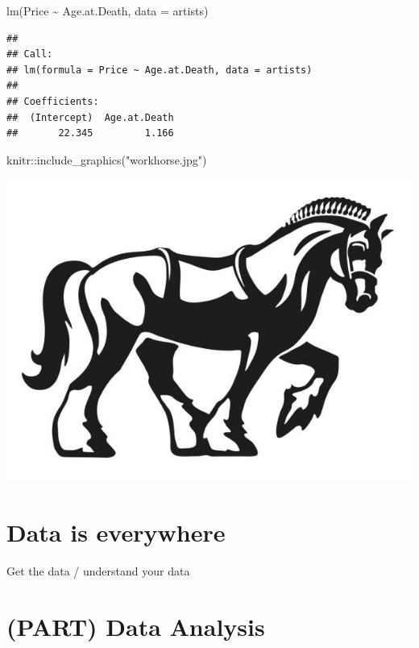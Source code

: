 \documentclass[
]{book}
\newenvironment{Shaded}{\begin{snugshade}}{\end{snugshade}}
\newcommand{\AttributeTok}[1]{\textcolor[rgb]{0.77,0.63,0.00}{#1}}
\newcommand{\FunctionTok}[1]{\textcolor[rgb]{0.00,0.00,0.00}{#1}}
\newcommand{\NormalTok}[1]{#1}
\newcommand{\SpecialCharTok}[1]{\textcolor[rgb]{0.00,0.00,0.00}{#1}}
\newcommand{\StringTok}[1]{\textcolor[rgb]{0.31,0.60,0.02}{#1}}
\begin{document}
\begin{Shaded}
\begin{Highlighting}[]
\FunctionTok{lm}\NormalTok{(Price }\SpecialCharTok{\textasciitilde{}}\NormalTok{ Age.at.Death, }\AttributeTok{data =}\NormalTok{ artists)}
\end{Highlighting}
\end{Shaded}

\begin{verbatim}
## 
## Call:
## lm(formula = Price ~ Age.at.Death, data = artists)
## 
## Coefficients:
##  (Intercept)  Age.at.Death  
##       22.345         1.166
\end{verbatim}

\begin{Shaded}
\begin{Highlighting}[]
\NormalTok{knitr}\SpecialCharTok{::}\FunctionTok{include\_graphics}\NormalTok{(}\StringTok{"workhorse.jpg"}\NormalTok{)}
\end{Highlighting}
\end{Shaded}

\includegraphics{workhorse.jpg}

\hypertarget{data-is-everywhere-1}{%
\chapter{Data is everywhere}\label{data-is-everywhere-1}}

Get the data / understand your data

\hypertarget{part-data-analysis}{%
\chapter*{(PART) Data Analysis}\label{part-data-analysis}}
\end{document}
